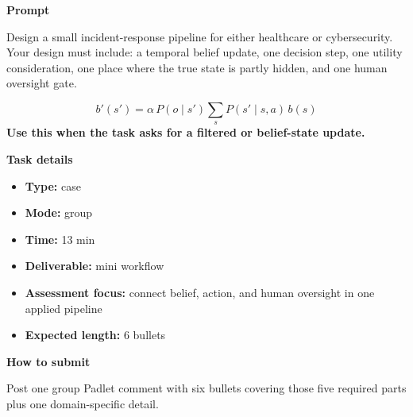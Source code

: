\documentclass[11pt]{article}
\begin{document}
\begin{tcolorbox}[colback=white,colframe=MidnightBlue,title={Q7 DDN and POMDP Synthesis Case},fonttitle=\bfseries,breakable]
\begin{center}
\end{center}

{\large\bfseries\color{MidnightBlue} Prompt}\par\medskip
Design a small incident-response pipeline for either healthcare or cybersecurity. Your design must include: a temporal belief update, one decision step, one utility consideration, one place where the true state is partly hidden, and one human oversight gate.

\begin{tcolorbox}[colback=ForestGreen!5,colframe=ForestGreen,title={Formula reminder},fonttitle=\bfseries,breakable]
\[
b'(s')=\alpha \, P(o \mid s') \sum_{s} P(s' \mid s,a)\,b(s)
\]
\textbf{Use this when the task asks for a filtered or belief-state update.}
\end{tcolorbox}

{\large\bfseries\color{MidnightBlue} Task details}\par\medskip
\begin{itemize}\item \textbf{Type:} case
\item \textbf{Mode:} group
\item \textbf{Time:} 13 min
\item \textbf{Deliverable:} mini workflow
\item \textbf{Assessment focus:} connect belief, action, and human oversight in one applied pipeline
\item \textbf{Expected length:} 6 bullets\end{itemize}

{\large\bfseries\color{MidnightBlue} How to submit}\par\medskip
Post one group Padlet comment with six bullets covering those five required parts plus one domain-specific detail.


\end{tcolorbox}
\end{document}
